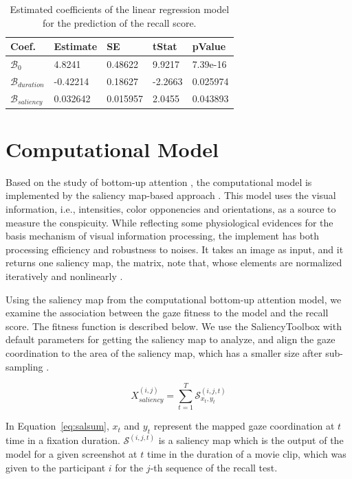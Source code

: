 \documentclass[oneside,master]{snueethesis}
\begin{document}
\begin{table}[!ht]
\begin{center} 
\caption{Estimated coefficients of the linear regression model for the prediction of the recall score.} 
\vskip 0.12in
\label{tab:lr-coef} 
\begin{tabular}{lllll} 
\hline
Coef. & Estimate & SE & tStat & pValue \\ 
\hline
$\mathcal{B}_{0}$    &  4.8241   &  0.48622  &  9.9217 &  7.39e-16  \\
$\mathcal{B}_{duration}$ & -0.42214  &  0.18627  & -2.2663 &  0.025974    \\
$\mathcal{B}_{saliency}$ &  0.032642 &  0.015957 &  2.0455 &  0.043893    \\
\hline
\end{tabular} 
\end{center} 
\end{table}

\section{Computational Model}

Based on the study of bottom-up attention \cite{koch1985shifts}, the computational model is implemented by the saliency map-based approach \cite{itti1998model}. This model uses the visual information, i.e., intensities, color opponencies and orientations, as a source to measure the conspicuity. While reflecting some physiological evidences for the basis mechanism of visual information processing, the implement has both processing efficiency and robustness to noises. It takes an image as input, and it returns one saliency map, the matrix, note that, whose elements are normalized iteratively and nonlinearly \cite{itti2000saliency}.

Using the saliency map from the computational bottom-up attention model, we examine the association between the gaze fitness to the model and the recall score. The fitness function is described below. We use the SaliencyToolbox with default parameters for getting the saliency map to analyze, and align the gaze coordination to the area of the saliency map, which has a smaller size after sub-sampling \cite{Walther2006}.

\begin{equation}\label{eq:salsum}
X_{saliency}^{(i,j)} = \sum_{t=1}^{T} \mathcal{S}_{x_{t},y_{t}}^{(i,j,t)}
\end{equation}

In Equation~\ref{eq:salsum}, $x_{t}$ and $y_{t}$ represent the mapped gaze coordination at $t$ time in a fixation duration. $\mathcal{S}^{(i,j,t)}$ is a saliency map which is the output of the model for a given screenshot at $t$ time in the duration of a movie clip, which was given to the participant $i$ for the $j$-th sequence of the recall test.
\end{document}
